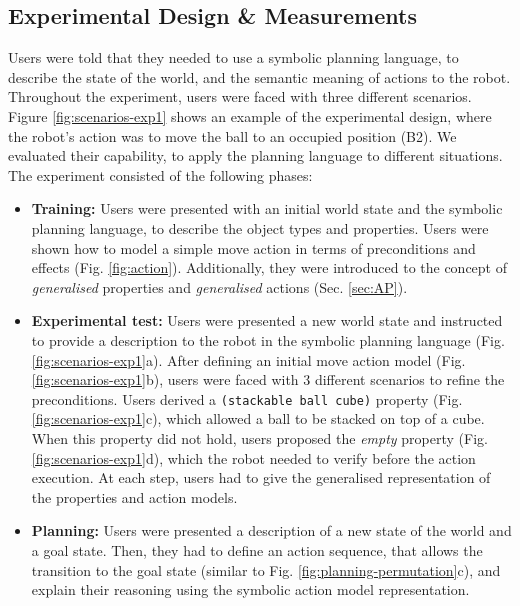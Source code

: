 \subsection{Experimental Design \& Measurements}
Users were told that they needed to use a symbolic planning language, to describe the state of the world, and the semantic meaning of actions to the robot. Throughout the experiment, users were faced with three different scenarios. Figure \ref{fig:scenarios-exp1} shows an example of the experimental design, where the robot's action was to move the ball to an occupied position (B2). We evaluated their capability, to apply the planning language to different situations. The experiment consisted of the following phases:
\begin{itemize}
  \item{\textbf{Training:} Users were presented with an initial world state and the symbolic planning language, to describe the object types and properties. Users were shown how to model a simple move action in terms of preconditions and effects (Fig. \ref{fig:action}). Additionally, they were introduced to the concept of \textit{generalised} properties and \textit{generalised} actions (Sec. \ref{sec:AP}).}
  \item{\textbf{Experimental test:} Users were presented a new world state and instructed to provide a description to the robot in the symbolic planning language (Fig. \ref{fig:scenarios-exp1}a). After defining an initial move action model (Fig. \ref{fig:scenarios-exp1}b), users were faced with 3 different scenarios to refine the preconditions. Users derived a \texttt{(stackable ball cube)} property (Fig. \ref{fig:scenarios-exp1}c), which allowed a ball to be stacked on top of a cube. When this property did not hold, users proposed the \textit{empty} property (Fig. \ref{fig:scenarios-exp1}d), which the robot needed to verify before the action execution. At each step, users had to give the generalised representation of the properties and action models.}
  \item{\textbf{Planning:} Users were presented a description of a new state of the world and a goal state. Then, they had to define an action sequence, that allows the transition to the goal state (similar to Fig. \ref{fig:planning-permutation}c), and explain their reasoning using the symbolic action model representation.}

\end{itemize}
